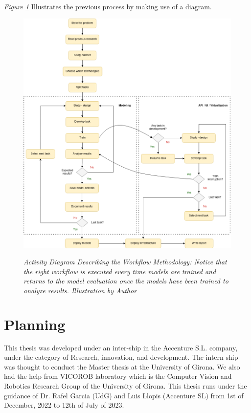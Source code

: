 \textit{Figure \ref{fig:flux_development}} Illustrates the previous process by making use of a diagram.

\newpage


\begin{figure}[H]
  \centering
  \includegraphics[width=\textwidth]{imatges/planing_and_methodology/EmplyedMethodology.png}
  \caption[Activity Diagram Describing the Methodology.]{\textit{Activity Diagram Describing the Workflow Methodology: Notice that the right workflow is executed every time models are trained and returns to the model evaluation once the models have been trained to analyze results. Illustration by Author}}
  {\label{fig:flux_development}}
\end{figure}


\newpage


\section{Planning}

This thesis was developed under an inter-ship in the Accenture S.L. company,
under the category of Research, innovation, and development. The intern-ship
was thought to conduct the Master thesis at the University of Girona. We also
had the help from VICOROB laboratory which is the Computer Vision and Robotics
Research Group of the University of Girona. This thesis runs under the guidance
of Dr. Rafel Garcia (UdG) and Luis Llopis (Accenture SL) from 1st of December,
2022 to 12th of July of 2023. \\


